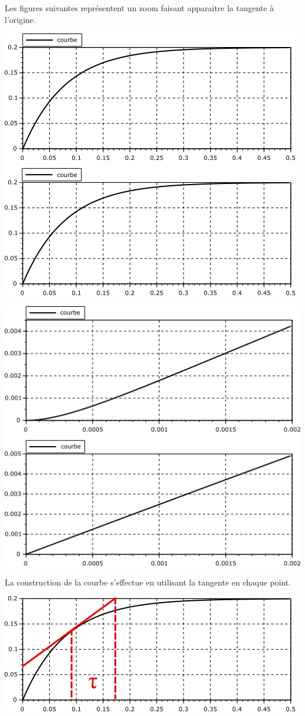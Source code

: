 Les figures suivantes représentent un zoom faisant apparaitre la tangente à l'origine.
\begin{center}
	\includegraphics[width=0.7\linewidth]{img/courbe1}
\end{center}

\begin{center}
	\includegraphics[width=0.7\linewidth]{img/courbe1_2}
\end{center}

La construction de la courbe s'effectue en utilisant la tangente en chaque point.

\begin{center}
	\includegraphics[width=0.7\linewidth]{img/tau}
\end{center}

